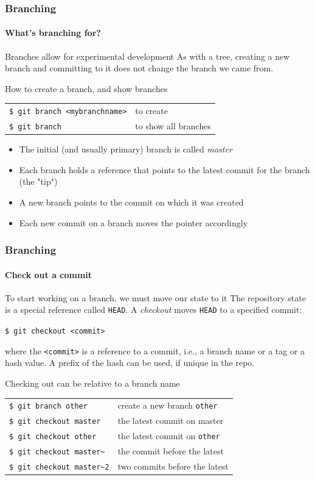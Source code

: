 \begin{frame}
\frametitle{Branching}
\framesubtitle{What's branching for?}

\begin{block}{Branches allow for experimental development}
As with a tree, creating a new branch and committing to it does not change the branch we came from.
\end{block}

\begin{block}{How to create a branch, and show branches}
\begin{tabular}{ll}
\texttt{\$ git branch <mybranchname>} & to create \\
\texttt{\$ git branch} & to show all branches
\end{tabular}

\medskip
\begin{itemize}
\item The initial (and usually primary) branch is called {\em master}
\item Each branch holds a reference that points to the latest commit for the branch (the "tip")
\item A new branch points to the commit on which it was created
\item Each new commit on a branch moves the pointer accordingly
\end{itemize}
\end{block}

\end{frame}

\begin{frame}
\frametitle{Branching}
\framesubtitle{Check out a commit}

\begin{block}{To start working on a branch, we must move our state to it}
The repository state is a special reference called \texttt{HEAD}. A {\em checkout} moves \texttt{HEAD} to a specified commit:

\texttt{\$ git checkout <commit>}

\medskip
where the \texttt{<commit>} is a reference to a commit, i.e., a branch name or a tag or a hash value. A prefix of the hash can be used, if unique in the repo. 
\end{block}

\pause
\begin{block}{Checking out can be relative to a branch name}
\begin{tabular}{ll}
\texttt{\$ git branch other} & create a new branch \texttt{other} \\
\texttt{\$ git checkout master} & the latest commit on master \\
\texttt{\$ git checkout other} & the latest commit on \texttt{other} \\
\texttt{\$ git checkout master\textasciitilde{}} & the commit before the latest \\
\texttt{\$ git checkout master\textasciitilde{}2} & two commits before the latest
\end{tabular}
\end{block}
\end{frame}

